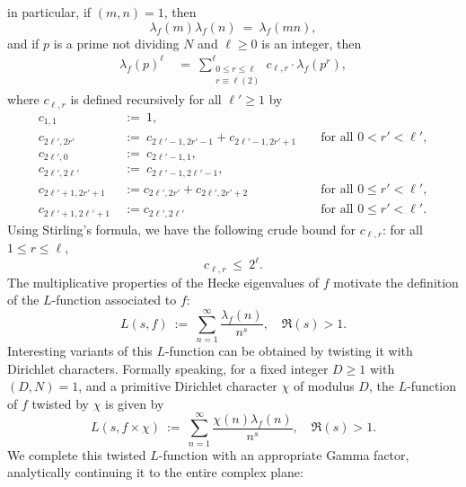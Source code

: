 \documentclass[12pt, reqno,oneside]{amsart}
\theoremstyle{plain}
\theoremstyle{definition}
\theoremstyle{remark}
\theoremstyle{plain}
\numberwithin{equation}{section}
\begin{document}
in particular, if $(m,n)=1$, then
\begin{equation}\label{eq:mult-prop}
\lambda_f(m)\lambda_f(n) \ = \ \lambda_f(mn),
\end{equation}
and if $p$ is a prime not dividing $N$ and $\ell \geq 0$ is an integer, then
\begin{align}\label{eq:hecke-comb}
\lambda_f(p)^{\ell} \ &= \ \sum_{\substack{0 \leq r \leq \ell \\ r \equiv \ell (2)}}^\ell c_{\ell,r}\cdot\lambda_f(p^{r}),
\end{align}
where $c_{\ell,r}$ is defined recursively for all $\ell' \geq 1$ by
\begin{align}
\label{eq:hecke-comb-recursive}\nonumber
c_{1,1} \ &:= \ 1, \\
\nonumber
c_{2\ell',2r'} \ &:= \ c_{2\ell'-1,2r'-1}+c_{2\ell'-1,2r'+1} && \text{ for all } 0 < r' < \ell', \\
\nonumber
c_{2\ell',0} \ &:= \ c_{2\ell'-1,1}, \\
\nonumber
c_{2\ell',2\ell'} \ &:= \ c_{2\ell'-1,2\ell'-1}, \\
\nonumber
c_{2\ell'+1,2r'+1} \ &:= c_{2\ell',2r'}+c_{2\ell',2r'+2} && \text{ for all } 0 \leq r' < \ell', \\
c_{2\ell'+1,2\ell'+1} \ &:= c_{2\ell',2\ell'} && \text{ for all } 0 \leq r' < \ell'.
\end{align}
Using Stirling's formula, we have the following crude bound for $c_{\ell,r}$: for all $1 \leq r \leq \ell$,
\begin{equation}\label{eq:hecke-bound}
c_{\ell,r} \ \leq \ 2^{\ell}.
\end{equation}
The multiplicative properties of the Hecke eigenvalues of $f$ motivate the definition of the $L$-function associated to $f$:
\begin{equation}
L(s,f) \ := \ \sum_{n=1}^{\infty}\frac{\lambda_f(n)}{n^s}, \quad \Re(s)>1.
\end{equation}
Interesting variants of this $L$-function can be obtained by twisting it with Dirichlet characters. Formally speaking, for a fixed integer $D\geq1$ with $(D,N)=1$, and a primitive Dirichlet character $\chi$ of modulus $D$, the $L$-function of $f$ twisted by $\chi$ is given by
\begin{equation}
    L(s,f\times\chi) \ := \ \sum_{n=1}^\infty\frac{\chi(n)\lambda_f(n)}{n^s},\quad\Re(s)>1.
\end{equation}
We complete this twisted $L$-function with an appropriate Gamma factor, analytically continuing it to the entire complex plane:
\end{document}
